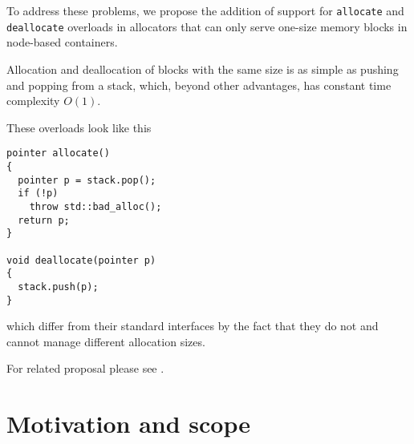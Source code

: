 \documentclass[11pt]{article}
\begin{document}
To address these problems, we propose the addition of support for
\texttt{allocate} and \texttt{deallocate} overloads in allocators
that can only serve one-size memory blocks in node-based containers.

Allocation and deallocation of blocks with the same size is as simple
as pushing and popping from a stack, which, beyond other advantages,
has constant time complexity $O(1)$.

These overloads look like this
\begin{lstlisting}
pointer allocate()
{
  pointer p = stack.pop(); 
  if (!p)
    throw std::bad_alloc();
  return p; 
}

void deallocate(pointer p)
{
  stack.push(p);
}
\end{lstlisting}
which differ from their standard interfaces by the fact
that they do not and cannot manage different allocation sizes.

For related proposal please see \cite{prop1}.

\section{Motivation and scope}
\end{document}
